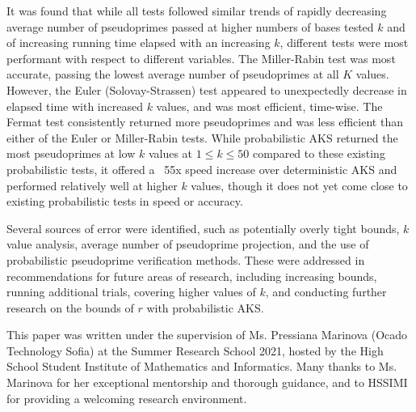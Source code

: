 \documentclass{article}
\begin{document}
It was found that while all tests followed similar trends of rapidly decreasing average number of pseudoprimes passed at higher numbers of bases tested $k$ and of increasing running time elapsed with an increasing $k$, different tests were most performant with respect to different variables. The Miller-Rabin test was most accurate, passing the lowest average number of pseudoprimes at all $K$ values. However, the Euler (Solovay-Strassen) test appeared to unexpectedly decrease in elapsed time with increased $k$ values, and was most efficient, time-wise. The Fermat test consistently returned more pseudoprimes and was less efficient than either of the Euler or Miller-Rabin tests. While probabilistic AKS returned the most pseudoprimes at low $k$ values at $1 \leq k \leq 50$ compared to these existing probabilistic tests, it offered a ~55x speed increase over deterministic AKS and performed relatively well at higher $k$ values, though it does not yet come close to existing probabilistic tests in speed or accuracy.

Several sources of error were identified, such as potentially overly tight bounds, $k$ value analysis, average number of pseudoprime projection, and the use of probabilistic pseudoprime verification methods. These were addressed in recommendations for future areas of research, including increasing bounds, running additional trials, covering higher values of $k$, and conducting further research on the bounds of $r$ with probabilistic AKS.

This paper was written under the supervision of Ms. Pressiana Marinova (Ocado Technology Sofia) at the Summer Research School 2021, hosted by the High School Student Institute of Mathematics and Informatics. Many thanks to Ms. Marinova for her exceptional mentorship and thorough guidance, and to HSSIMI for providing a welcoming research environment.

\newpage
\nocite{*}


\end{document}
